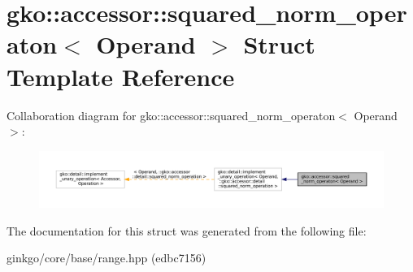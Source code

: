 \hypertarget{structgko_1_1accessor_1_1squared__norm__operaton}{}\section{gko\+:\+:accessor\+:\+:squared\+\_\+norm\+\_\+operaton$<$ Operand $>$ Struct Template Reference}
\label{structgko_1_1accessor_1_1squared__norm__operaton}


Collaboration diagram for gko\+:\+:accessor\+:\+:squared\+\_\+norm\+\_\+operaton$<$ Operand $>$\+:
\nopagebreak
\begin{figure}[H]
\begin{center}
\leavevmode
\includegraphics[width=350pt]{structgko_1_1accessor_1_1squared__norm__operaton__coll__graph}
\end{center}
\end{figure}


The documentation for this struct was generated from the following file\+:\begin{DoxyCompactItemize}
\item 
ginkgo/core/base/range.\+hpp (edbc7156)\end{DoxyCompactItemize}
